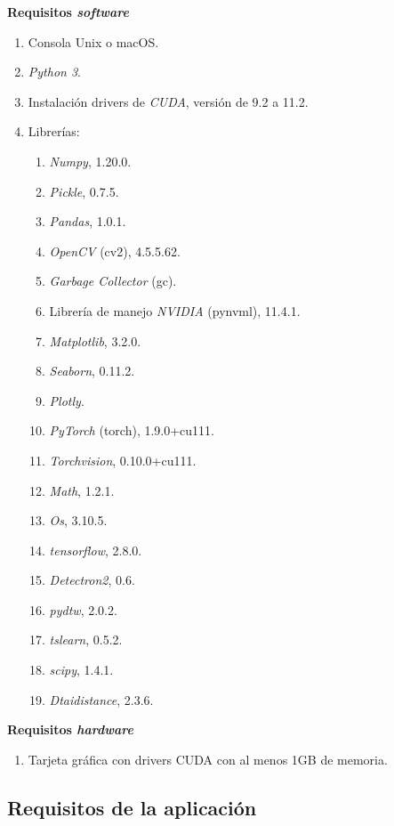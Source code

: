 \textbf{Requisitos \textit{software}}
\begin{enumerate}
    \item Consola Unix o macOS.
    \item \textit{Python 3}.
    \item Instalación drivers de \textit{CUDA}, versión de 9.2 a 11.2.
    \item Librerías:
    \begin{enumerate}
        \item \textit{Numpy}, 1.20.0.
        \item \textit{Pickle}, 0.7.5.
        \item \textit{Pandas}, 1.0.1.
        \item \textit{OpenCV} (cv2), 4.5.5.62.
        \item \textit{Garbage Collector} (gc).
        \item Librería de manejo \textit{NVIDIA} (pynvml), 11.4.1.
        \item \textit{Matplotlib}, 3.2.0.
        \item \textit{Seaborn}, 0.11.2.
        \item \textit{Plotly}.
        \item \textit{PyTorch} (torch), 1.9.0+cu111.
        \item \textit{Torchvision}, 0.10.0+cu111.
        \item \textit{Math}, 1.2.1.
        \item \textit{Os}, 3.10.5.
        \item \textit{tensorflow}, 2.8.0.
        \item \textit{Detectron2}, 0.6.
        \item \textit{pydtw}, 2.0.2.
        \item \textit{tslearn}, 0.5.2.
        \item \textit{scipy}, 1.4.1.
        \item \textit{Dtaidistance}, 2.3.6.
    \end{enumerate}

\end{enumerate}

\textbf{Requisitos \textit{hardware}}
\begin{enumerate}
    \item Tarjeta gráfica con drivers CUDA con al menos 1GB de memoria.
\end{enumerate}

\subsection{Requisitos de la aplicación}

